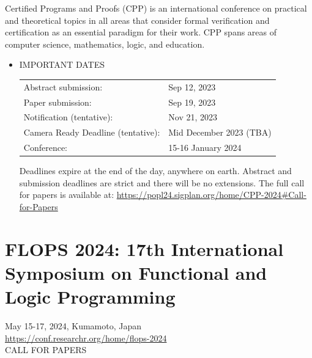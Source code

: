 \documentclass[prodmode,acmtecs]{acmsmall} %
\begin{document}
  Certified Programs and Proofs (CPP) is an international conference on practical and theoretical topics in all areas that consider formal verification and certification as an essential paradigm for their work. CPP spans areas of computer science, mathematics, logic, and education.\\ 
\begin{itemize}\item  IMPORTANT DATES 
 
\begin{tabulary}{\linewidth}{LL}Abstract submission:  & Sep 12, 2023 \\
Paper submission:  & Sep 19, 2023 \\
Notification (tentative):  & Nov 21, 2023 \\
Camera Ready Deadline (tentative):  & Mid December 2023 (TBA) \\
Conference:  & 15-16 January 2024 \\
\end{tabulary}
 
  Deadlines expire at the end of the day, anywhere on earth. Abstract and submission deadlines are strict and there will be no extensions. The full call for papers is available at: \href{https://popl24.sigplan.org/home/CPP-2024#Call-for-Papers}{https://popl24.sigplan.org/home/CPP-2024\#Call-for-Papers} 
 
\end{itemize}\section{FLOPS 2024: 17th International Symposium on Functional and Logic Programming}\label{FLOPS2024}  May 15-17, 2024, Kumamoto, Japan\\ 
  \href{https://conf.researchr.org/home/flops-2024}{https://conf.researchr.org/home/flops-2024}\\ 
CALL FOR PAPERS 
\end{document}
